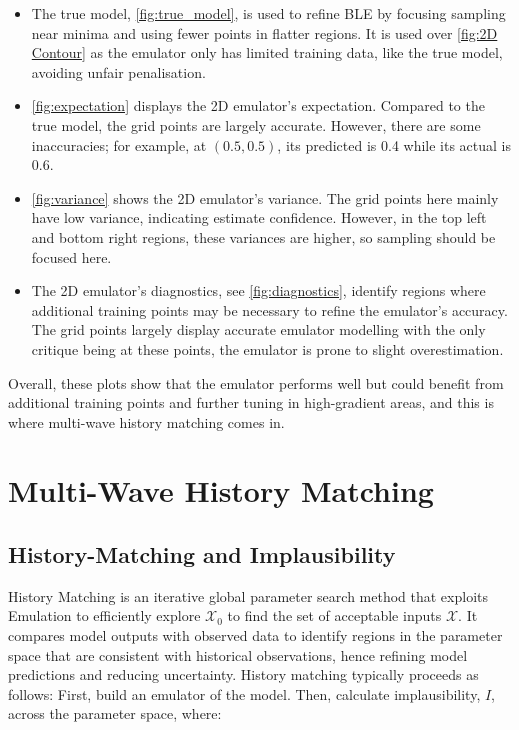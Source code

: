 \documentclass[12pt]{report} %
\begin{document}
\begin{itemize}
    \item The true model, \ref{fig:true_model}, is used to refine BLE by focusing sampling near minima and using fewer points in flatter regions. It is used over \ref{fig:2D Contour} as the emulator only has limited training data, like the true model, avoiding unfair penalisation.
    
    \item \ref{fig:expectation} displays the 2D emulator's expectation. Compared to the true model, the grid points are largely accurate. However, there are some inaccuracies; for example, at $(0.5,0.5)$, its predicted is 0.4 while its actual is 0.6. 

    \item \ref{fig:variance} shows the 2D emulator's variance. The grid points here mainly have low variance, indicating estimate confidence. However, in the top left and bottom right regions, these variances are higher, so sampling should be focused here.

    \item The 2D emulator's diagnostics, see \ref{fig:diagnostics}, identify regions where additional training points may be necessary to refine the emulator's accuracy. The grid points largely display accurate emulator modelling with the only critique being at these points, the emulator is prone to slight overestimation.

\end{itemize}

\noindent Overall, these plots show that the emulator performs well but could benefit from additional training points and further tuning in high-gradient areas, and this is where multi-wave history matching comes in.

\section{Multi-Wave History Matching}

\subsection{History-Matching and Implausibility}
History Matching is an iterative global parameter search method that exploits Emulation to efficiently explore $\mathcal{X}_0$ to find the set of acceptable inputs $\mathcal{X}$.\cite{vernon2024} It compares model outputs with observed data to identify regions in the parameter space that are consistent with historical observations, hence refining model predictions and reducing uncertainty. History matching typically proceeds as follows: First, build an emulator of the model.
Then, calculate implausibility, $I$, across the parameter space, where:
\end{document}
